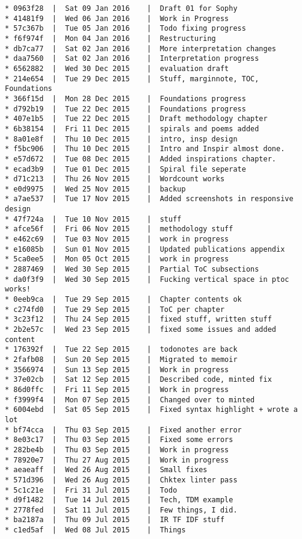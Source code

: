 \begin{verbatim}
* 0963f28  |  Sat 09 Jan 2016	 |  Draft 01 for Sophy
* 41481f9  |  Wed 06 Jan 2016	 |  Work in Progress
* 57c367b  |  Tue 05 Jan 2016	 |  Todo fixing progress
* f6f974f  |  Mon 04 Jan 2016	 |  Restructuring
* db7ca77  |  Sat 02 Jan 2016	 |  More interpretation changes
* daa7560  |  Sat 02 Jan 2016	 |  Interpretation progress
* 6562882  |  Wed 30 Dec 2015	 |  evaluation draft
* 214e654  |  Tue 29 Dec 2015	 |  Stuff, marginnote, TOC, Foundations
* 366f15d  |  Mon 28 Dec 2015	 |  Foundations progress
* d792b19  |  Tue 22 Dec 2015	 |  Foundations progress
* 407e1b5  |  Tue 22 Dec 2015	 |  Draft methodology chapter
* 6b38154  |  Fri 11 Dec 2015	 |  spirals and poems added
* 8a01e8f  |  Thu 10 Dec 2015	 |  intro, insp design
* f5bc906  |  Thu 10 Dec 2015	 |  Intro and Inspir almost done.
* e57d672  |  Tue 08 Dec 2015	 |  Added inspirations chapter.
* ecad3b9  |  Tue 01 Dec 2015	 |  Spiral file seperate
* d71c213  |  Thu 26 Nov 2015	 |  Wordcount works
* e0d9975  |  Wed 25 Nov 2015	 |  backup
* a7ae537  |  Tue 17 Nov 2015	 |  Added screenshots in responsive design
* 47f724a  |  Tue 10 Nov 2015	 |  stuff
* afce56f  |  Fri 06 Nov 2015	 |  methodology stuff
* e462c69  |  Tue 03 Nov 2015	 |  work in progress
* e16085b  |  Sun 01 Nov 2015	 |  Updated publications appendix
* 5ca0ee5  |  Mon 05 Oct 2015	 |  work in progress
* 2887469  |  Wed 30 Sep 2015	 |  Partial ToC subsections
* da0f3f9  |  Wed 30 Sep 2015	 |  Fucking vertical space in ptoc works!
* 0eeb9ca  |  Tue 29 Sep 2015	 |  Chapter contents ok
* c274fd0  |  Tue 29 Sep 2015	 |  ToC per chapter
* 3c23f12  |  Thu 24 Sep 2015	 |  fixed stuff, written stuff
* 2b2e57c  |  Wed 23 Sep 2015	 |  fixed some issues and added content
* 176392f  |  Tue 22 Sep 2015	 |  todonotes are back
* 2fafb08  |  Sun 20 Sep 2015	 |  Migrated to memoir
* 3566974  |  Sun 13 Sep 2015	 |  Work in progress
* 37e02cb  |  Sat 12 Sep 2015	 |  Described code, minted fix
* 86d0ffc  |  Fri 11 Sep 2015	 |  Work in progress
* f3999f4  |  Mon 07 Sep 2015	 |  Changed over to minted
* 6004ebd  |  Sat 05 Sep 2015	 |  Fixed syntax highlight + wrote a lot
* bf74cca  |  Thu 03 Sep 2015	 |  Fixed another error
* 8e03c17  |  Thu 03 Sep 2015	 |  Fixed some errors
* 282be4b  |  Thu 03 Sep 2015	 |  Work in progress
* 78920e7  |  Thu 27 Aug 2015	 |  Work in progress
* aeaeaff  |  Wed 26 Aug 2015	 |  Small fixes
* 571d396  |  Wed 26 Aug 2015	 |  Chktex linter pass
* 5c1c21e  |  Fri 31 Jul 2015	 |  Todo
* d9f1482  |  Tue 14 Jul 2015	 |  Tech, TDM example
* 2778fed  |  Sat 11 Jul 2015	 |  Few things, I did.
* ba2187a  |  Thu 09 Jul 2015	 |  IR TF IDF stuff
* c1ed5af  |  Wed 08 Jul 2015	 |  Things

\end{verbatim}
